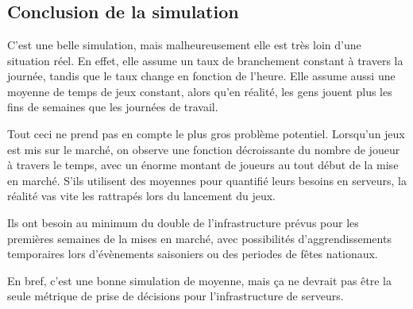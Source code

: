     \begin{center}
    \end{center}
    { \hspace*{\fill} \\}

    \begin{center}
    \end{center}
    { \hspace*{\fill} \\}

    \begin{center}
    \end{center}
    { \hspace*{\fill} \\}

    \subsection{Conclusion de la
simulation}\label{conclusion-de-la-simulation}

C'est une belle simulation, mais malheureusement elle est très loin
d'une situation réel. En effet, elle assume un taux de branchement
constant à travers la journée, tandis que le taux change en fonction de
l'heure. Elle assume aussi une moyenne de temps de jeux constant, alors
qu'en réalité, les gens jouent plus les fins de semaines que les
journées de travail.

Tout ceci ne prend pas en compte le plus gros problème potentiel.
Lorsqu'un jeux est mis sur le marché, on observe une fonction
décroissante du nombre de joueur à travers le temps, avec un énorme
montant de joueurs au tout début de la mise en marché. S'ils utilisent
des moyennes pour quantifié leurs besoins en serveurs, la réalité vas
vite les rattrapés lors du lancement du jeux.

Ils ont besoin au minimum du double de l'infrastructure prévus pour les
premières semaines de la mises en marché, avec possibilités
d'aggrendissements temporaires lors d'évènements saisoniers ou des
periodes de fêtes nationaux.

En bref, c'est une bonne simulation de moyenne, mais ça ne devrait pas
être la seule métrique de prise de décisions pour l'infrastructure de
serveurs.
